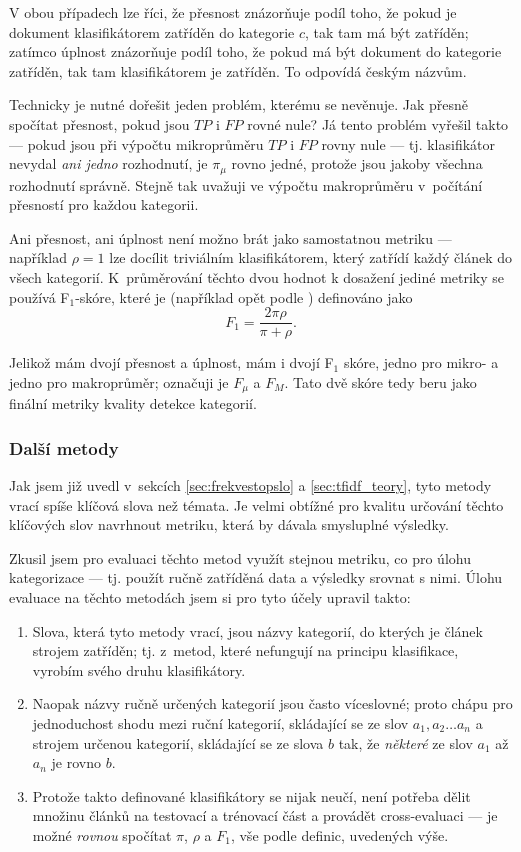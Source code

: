 \documentclass[12pt,a4paper]{report}
\begin{document}
V obou případech lze říci, že přesnost znázorňuje podíl toho, že pokud je dokument klasifikátorem zatříděn do kategorie $c$, tak tam má být zatříděn; zatímco úplnost znázorňuje podíl toho, že pokud má být dokument do kategorie zatříděn, tak tam klasifikátorem je zatříděn. To odpovídá českým názvům. 

Technicky je nutné dořešit jeden problém, kterému se \cite{machine_intro} ne\-vě\-nu\-je. Jak přesně spočítat přesnost, pokud jsou $TP$ i $FP$ rovné nule? Já tento problém vyřešil takto --- pokud jsou při výpočtu mikroprůměru $TP$ i $FP$ rovny nule --- tj. klasifikátor nevydal \emph{ani jedno} rozhodnutí, je $\pi_{\mu}$ rovno jedné, protože jsou jakoby všechna rozhodnutí správně. Stejně tak uvažuji ve výpočtu makroprůměru v~počítání  přesností pro každou kategorii.

Ani přesnost, ani úplnost není možno brát jako samostatnou metriku --- například $\rho=1$ lze docílit triviálním klasifikátorem, který zatřídí každý článek do všech kategorií. K~průměrování těchto dvou hodnot k dosažení jediné metriky se používá F$_1$-skóre, které je (například opět podle \cite{machine_intro}) definováno jako $$F_1=\frac{2\pi\rho}{\pi+\rho}.$$ 

Jelikož mám dvojí přesnost a úplnost, mám i dvojí F$_1$ skóre, jedno pro mikro- a jedno pro makroprůměr; označuji je $F_\mu$ a $F_M$. Tato dvě skóre tedy beru jako finální metriky kvality detekce kategorií.

\subsubsection{Další metody}
\label{sec:dalsimetody}

Jak jsem již uvedl v~sekcích \ref{sec:frekvestopslo} a \ref{sec:tfidf_teory}, tyto metody vrací spíše klíčová slova než témata. Je velmi obtížné pro kvalitu určování těchto klíčových slov navrhnout metriku, která by dávala smysluplné výsledky.

Zkusil jsem pro evaluaci těchto metod využít stejnou metriku, co pro úlohu kategorizace --- tj. použít ručně zatříděná data a výsledky srovnat s nimi. Úlohu evaluace na těchto metodách jsem si pro tyto účely upravil takto:
\begin{enumerate}
    \item Slova, která tyto metody vrací, jsou názvy kategorií, do kterých je článek strojem zatříděn; tj. z~metod, které nefungují na principu klasifikace, vyrobím svého druhu klasifikátory.
    \item Naopak názvy ručně určených kategorií jsou často víceslovné; proto chápu pro jednoduchost shodu mezi ruční kategorií, skládající se ze slov $a_1, a_2 \ldots a_n$ a strojem určenou kategorií, skládající se ze slova $b$ tak, že \emph{některé} ze slov $a_1$ až $a_n$ je rovno $b$.
    \item Protože takto definované klasifikátory se nijak neučí, není potřeba dělit množinu článků na testovací a trénovací část a provádět cross-evaluaci --- je možné \emph{rovnou} spočítat $\pi$, $\rho$ a $F_1$, vše podle definic, uvedených výše.
\end{enumerate}
\end{document}
